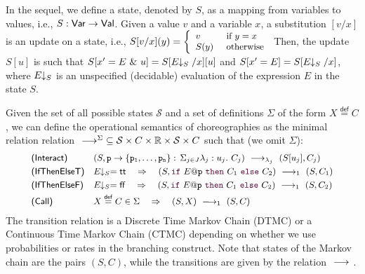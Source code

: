 \bigskip


 In the sequel, we define a state, denoted by $S$,
as a mapping from variables to values, i.e.,
$S: \mathsf{Var} \rightarrow\mathsf{Val}$. Given a value $v$ and a variable $x$, a
substitution $[v/x]$ is an update on a state, i.e.,
$\small S[v/x] (y)= \left\{
  \begin{array}{ll} 
    v    & \text{ if } y=x\\ 
    S(y) & \text{ otherwise}
  \end{array} \right.
$
%
Then, the update $S[u]$ is such that
$S[x'=E\ \&\ u] = S[E\!\!\downarrow_{S}/x][u]$ and $S[x'=E] = S[E\!\!\downarrow_{S}/x]$,
where $E\!\!\downarrow_{S}$ is an unspecified (decidable) evaluation of the
expression $E$ in the state $S$.

Given the set of all possible states $\mathcal S$ and a set of
definitions $\Sigma$ of the form $X\stackrel{\mathsf{def}}{=} C$, we
can define the operational semantics of choreographies as the minimal
relation relation
$\ \longrightarrow_{}\ \!\!\!\!^\Sigma\subseteq \mathcal S\times C\times \mathbb
R\times \mathcal S\times C$ such that (we omit $\Sigma$):
\begin{displaymath}\small
  \begin{array}{l@{\quad}llll}
    \textsf{(Interact)} &
    (S, \interact{p}{\role p_1,\ldots,\role p_n}) 
    \red{\lambda_j}
    (S[u_j], C_j) 
    \\[1mm]
    \textsf{(IfThenElseT)} &
    \eval ES = \mathsf{tt} \quad\Rightarrow\quad
    (S,\ifTE {E}{p}{C_1}{C_2}) 
    \red{1}
    (S, C_1)
    \\[1mm]
    \textsf{(IfThenElseF)} &
    \eval ES = \mathsf{ff} \quad\Rightarrow\quad
    (S,\ifTE {E}{p}{C_1}{C_2}) 
    \red{1}
    (S, C_2)
    \\[1mm]
    \textsf{(Call)} &
    X\stackrel{\mathsf{def}}{=} C\in\Sigma \quad\Rightarrow\quad (S, X) \red{1}(S,C)
  \end{array}
\end{displaymath}
The transition relation is a Discrete Time Markov Chain (DTMC) or a
Continuous Time Markov Chain (CTMC) depending on whether we use
probabilities or rates in the branching construct. Note that states of
the Markov chain are the pairs $(S,C)$, while the transitions are
given by the relation $\ \longrightarrow_{}\ $.
%

